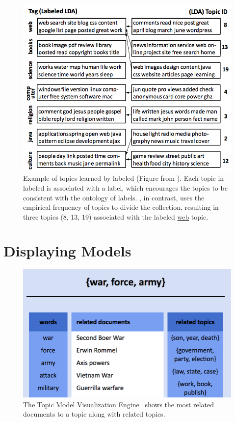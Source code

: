 \begin{figure}
  \begin{center}
    \includegraphics[width=.7\linewidth]{figures/viz_llda}
  \end{center}
  \caption{Example of topics learned by labeled  (Figure from
    \citet{ramage-09}).  Each topic in labeled  is associated with a
    label, which encourages the topics to be consistent with the ontology of
    labels.  , in contrast, uses the empirical frequency of topics to
    divide the collection, resulting in three topics (8, 13, 19) associated with
    the labeled  \underline{web} topic. }
  \label{fig:llda}
\end{figure}


\section{Displaying Models}

\begin{figure}
  \begin{center}
  \includegraphics[width=.8\linewidth]{figures/viz_tmve}
  \end{center}
  \caption{The Topic Model Visualization Engine~\citep{chaney-12}
    shows the most related documents to a topic along with related topics. }
  \label{fig:tmve}
\end{figure}

